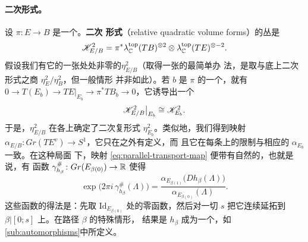 \paragraph{\trRelative{}二次\trVolume{}形式。}\label{sub:relative-volume-forms}
设 $\pi\colon E\to B$ 是一个\trFibrationWithSingularities。\textbf{\trRelative{}二次%
\trVolume{}形式}（relative quadratic volume forms）的丛是
\begin{equation*}
\mathscr{K}^2_{E/B}=\pi^*\lambda_{\mathbb{C}}^{\mathrm{top}}(TB)^{\otimes 2}
\otimes\lambda_{\mathbb{C}}^{\mathrm{top}}(TE)^{\otimes-2}.
\end{equation*}
假设我们有它的一张处处非零的\trSection{}$\eta^2_{E/B}$（取得一张的最简单办
法，是取\trTotalSpace{}与底上二次\trVolume{}形式之商 $\eta^2_E/\eta^2_B$，但一般情形
并非如此）。若 $b$ 是 $\pi$ 的一个\trRegularValue，就有\trShortExactSequence
$0\to T(E_b)\to TE|_{E_b}\to\pi^*TB_b\to 0$，它诱导出一个\trCanonical%
\trIsomorphism
\begin{equation*}
\mathscr{K}^2_{E/B}\big|_{E_b}\cong\mathscr{K}^2_{E_b}.
\end{equation*}
于是，$\eta^2_{E/B}$ 在各\trSmooth\trFiber{}上确定了二次复\trVolume{}形式
$\eta^2_{E_b}$。类似地，我们得到\trRelative\trSquaredPhase{}映射
$\alpha_{E/B}\colon Gr(TE^v)\to S^1$，它只在\trCriticalPoint{}之外有定义，而
且它在每条\trSmooth\trFiber{}上的限制与相应的 $\alpha_{E_b}$ 一致。在这种局面
下，\trParallelTransport{}映射 \eqref{eq:parallel-transport-map} 便带有自然的\trGrading，也就是说，有
函数 $\gamma^{\#}_{h_\beta}\colon Gr(E_{\beta(0)})\to\mathbb{R}$ 使得
\begin{equation}\label{eq:relative-grading-function}
\exp\bigl(2\pi i\,\gamma^{\#}_{h_\beta}(\Lambda)\bigr)
=\frac{\alpha_{E_{\beta(1)}}\bigl(Dh_\beta(\Lambda)\bigr)}
{\alpha_{E_{\beta(0)}}(\Lambda)}.
\end{equation}
这些函数的得法是：先取 $\mathrm{Id}_{E_{\beta(0)}}$ 处的零函数，然后对一切
$s$ 把它连续延拓到 $\beta|[0;s]$ 上。在\trClosed{}路径 $\beta$ 的特殊情形，
结果是 $h_\beta$ 成为一个\trGraded\trSymplectic\trAutomorphism，如\cref{sub:automorphisms}中所定义。
